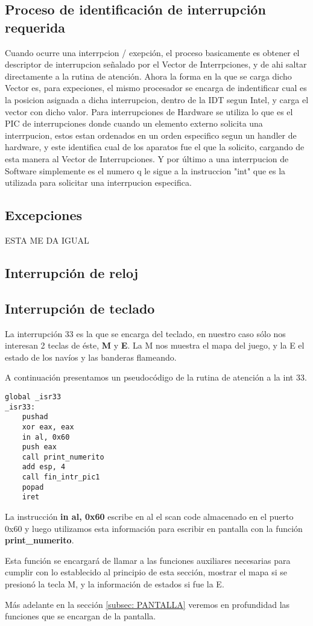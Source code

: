 \subsection{Proceso de identificación de interrupción requerida}
\par{Cuando ocurre una interrpcion / exepción, el proceso basicamente es obtener el descriptor de interrupcion señalado por el Vector de Interrpciones, y de ahi saltar directamente a la rutina de atención. Ahora la forma en la que se carga dicho Vector es, para expeciones, el mismo procesador se encarga de indentificar cual es la posicion asignada a dicha interrupcion, dentro de la IDT segun Intel, y carga el vector con dicho valor.  Para interrupciones de Hardware se utiliza lo que es el PIC de interrupciones donde cuando un elemento externo solicita una interrpucion, estos estan ordenados en un orden especifico segun un handler de hardware, y este identifica cual de los aparatos fue el que la solicito, cargando de esta manera al Vector de Interrupciones. Y por último a una interrpucion de Software simplemente es el numero q le sigue a la instruccion "int" que es la utilizada para solicitar una interrpucion especifica.}

\subsection{Excepciones}
\par{ESTA ME DA IGUAL}
\subsection{Interrupción de reloj}
\subsection{Interrupción de teclado}
\par{La interrupción 33 es la que se encarga del teclado, en nuestro caso sólo nos interesan 2 teclas de éste, \textbf{M} y \textbf{E}. La M nos muestra el mapa del juego, y la E el estado de los navíos y las banderas flameando.}
\par{A continuación presentamos un pseudocódigo de la rutina de atención a la int 33.}
\begin{lstlisting}[language={[x86masm]Assembler}]
global _isr33
_isr33:
    pushad
    xor eax, eax
    in al, 0x60
    push eax
    call print_numerito
    add esp, 4
    call fin_intr_pic1
    popad
    iret
\end{lstlisting}
\par{La instrucción \textbf{in al, 0x60} escribe en al el scan code almacenado en el puerto 0x60 y luego utilizamos esta información para escribir en pantalla con la función \textbf{print_numerito}.}
\par{Esta función se encargará de llamar a las funciones auxiliares necesarias para cumplir con lo establecido al principio de esta sección, mostrar el mapa si se presionó la tecla M, y la información de estados si fue la E.}
\par{Más adelante en la sección \ref{subsec: PANTALLA} veremos en profundidad las funciones que se encargan de la pantalla.}
